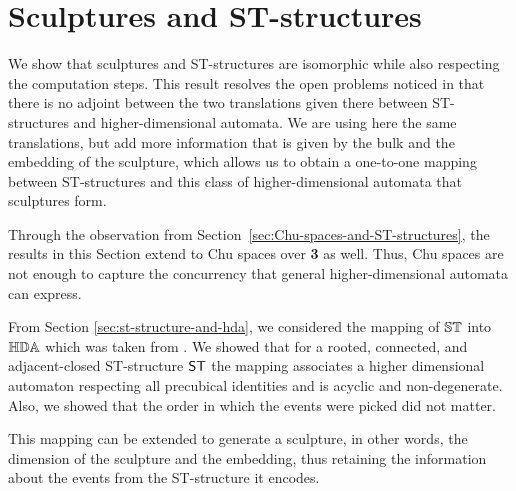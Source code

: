 \section{Sculptures and ST-structures}
    \label{sec:sculpture-and-st-structure}

    We show that sculptures and ST-structures are isomorphic while also respecting the computation steps. This result resolves the open problems noticed in \cite[Section 3.3]{Johansen16STstruct} that there is no adjoint between the two translations given there between ST-structures and higher-dimensional automata. We are using here the same translations, but add more information that is given by the bulk and the embedding of the sculpture, which allows us to obtain a one-to-one mapping between ST-structures and this class of higher-dimensional automata that sculptures form.
    
    Through the observation from Section~\ref{sec:Chu-spaces-and-ST-structures}, the results in this Section extend to Chu spaces over \textbf{3} as well. Thus, Chu spaces are not enough to capture the concurrency that general higher-dimensional automata can express.
    
    From Section \ref{sec:st-structure-and-hda}, we considered the mapping of $\mathbb{ST}$ into $\mathbb{HDA}$ which was taken from \cite{Johansen16STstruct}. We showed that for a rooted, connected, and adjacent-closed ST-structure $\mathsf{ST}$ the mapping associates a higher dimensional automaton respecting all precubical identities and is acyclic and non-degenerate. Also, we showed that the order in which the events were picked did not matter.
     
    This mapping can be extended to generate a sculpture, in other words, the dimension of the sculpture and the embedding, thus retaining the information about the events from the ST-structure it encodes.

